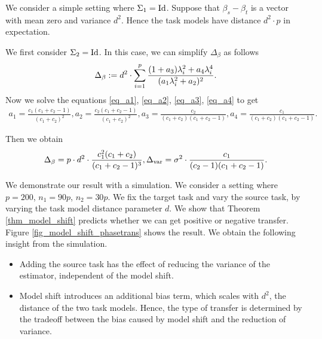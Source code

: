 \begin{example}
	We consider a simple setting where $\Sigma_1 = \operatorname{Id}$.
	Suppose that $\beta_s - \beta_t$ is a vector with mean zero and variance $d^2$. Hence the task models have distance $d^2\cdot p$ in expectation.

	We first consider $\Sigma_2 = \operatorname{Id}$. In this case, we can simplify $\Delta_{\beta}$ as follows
	\begin{align} \label{eq_delta_simple}
		\Delta_{\beta} := d^2 \cdot \sum_{i=1}^p \frac{(1 + a_3)\lambda_i^2 + a_4 \lambda_i^4}{(a_1 \lambda_i^2 + a_2)^2}.
	\end{align}
	Now we solve the equations \eqref{eq_a1}, \eqref{eq_a2}, \eqref{eq_a3}, \eqref{eq_a4} to get
	\begin{align}
		a_1 = \frac{c_1(c_1 + c_2 - 1)}{(c_1 + c_2)^2},
		a_2 = \frac{c_2(c_1 + c_2 - 1)}{(c_1 + c_2)^2},
		a_3 = \frac{c_2}{(c_1 + c_2)(c_1 + c_2 - 1)},
		a_4 = \frac{c_1}{(c_1 + c_2)(c_1 + c_2 - 1)}.
	\end{align}
	
	Then we obtain
	\begin{align}
		\Delta_{\beta} = p \cdot d^2 \cdot \frac{c_1^2 (c_1 + c_2)}{(c_1 + c_2 - 1)^3},
		\Delta_{\text{var}} = \sigma^2 \cdot \frac{c_1}{(c_2 - 1)(c_1 + c_2 - 1)}.
	\end{align}

	We demonstrate our result with a simulation.
	We consider a setting where $p = 200$, $n_1 = 90p$, $n_2 = 30p$.
	We fix the target task and vary the source task, by varying the task model distance parameter $d$.
	We show that Theorem \ref{thm_model_shift} predicts whether we can get positive or negative transfer.
	Figure \ref{fig_model_shift_phasetrans} shows the result.
	We obtain the following insight from the simulation.
	\begin{itemize}
		\item Adding the source task has the effect of reducing the variance of the estimator, independent of the model shift.
		\item Model shift introduces an additional bias term, which scales with $d^2$, the distance of the two task models.
		Hence, the type of transfer is determined by the tradeoff between the bias caused by model shift and the reduction of variance.
	\end{itemize}
\end{example}

